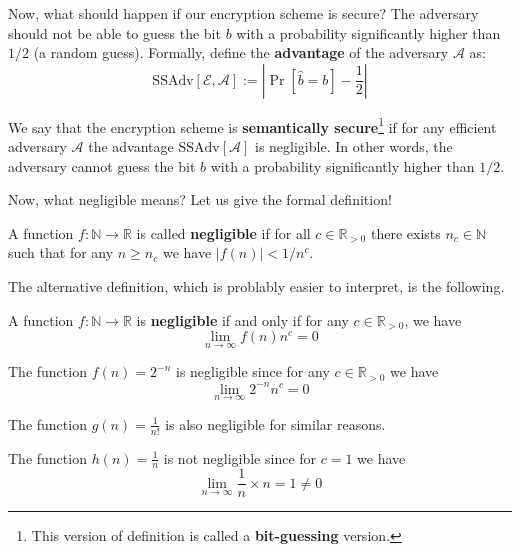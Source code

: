 \documentclass[../lecture-notes-148x210.tex]{subfiles}
\begin{document}
Now, what should happen if our encryption scheme is secure? The adversary should not be able to guess the bit $b$ with a probability significantly higher than $1/2$ (a random guess). Formally, define the 
\textbf{advantage} of the adversary $\mathcal{A}$ as:
\begin{equation*}
    \text{SSAdv}[\mathcal{E}, \mathcal{A}] := \left| \Pr[\hat{b} = b] - \frac{1}{2} \right|
\end{equation*}

We say that the encryption scheme is \textbf{semantically secure}\footnote{This version of definition is called a \textbf{bit-guessing} version.} if for any efficient adversary $\mathcal{A}$ the advantage $\text{SSAdv}[\mathcal{A}]$ is negligible. In other words, the adversary cannot guess the bit $b$ with a probability significantly higher than $1/2$.

Now, what negligible means? Let us give the formal definition!

\begin{definition}
    A function $f: \mathbb{N} \to \mathbb{R}$ is called \textbf{negligible} if for all $c \in \mathbb{R}_{>0}$ there exists $n_c \in \mathbb{N}$ such that for any $n \geq n_c$ we have $|f(n)| < 1/n^c$.
\end{definition}

The alternative definition, which is problably easier to interpret, is the following.

\begin{theorem}
    A function $f: \mathbb{N} \to \mathbb{R}$ is \textbf{negligible} if and only if for any $c \in \mathbb{R}_{>0}$, we have
    \begin{equation*}
        \lim_{n \to \infty} f(n)n^c = 0
    \end{equation*}
\end{theorem}

\begin{example}
    The function $f(n) = 2^{-n}$ is negligible since for any $c \in \mathbb{R}_{>0}$ we have
    \begin{equation*}
        \lim_{n \to \infty} 2^{-n}n^c = 0
    \end{equation*}

    The function $g(n) = \frac{1}{n!}$ is also negligible for similar reasons.
\end{example}

\begin{example}
    The function $h(n) = \frac{1}{n}$ is not negligible since for $c = 1$ we have
    \begin{equation*}
        \lim_{n \to \infty} \frac{1}{n} \times n = 1 \neq 0
    \end{equation*}
\end{example}
\end{document}
